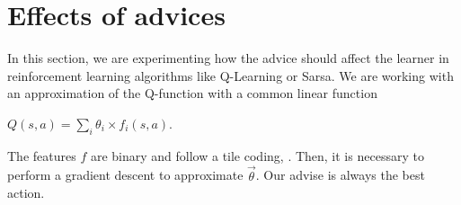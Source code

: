 \documentclass[a4paper,12pt]{article}
\begin{document}
    
% 
%      
% 
%     
%     
%      
%       
%       

      \newpage
      \section{Effects of advices}
      
      In this section, we are experimenting how the advice should affect the learner in reinforcement
      learning algorithms like Q-Learning or Sarsa.
      We are working with an approximation of the Q-function with a common linear function 
      \begin{footnotesize}
       $Q(s,a) = \sum\limits_{i} \theta_{i} \times f_{i}(s,a)$.
      \end{footnotesize}
      The features $f$ are binary and follow a tile coding, \cite{ReinforceLearningIntro}.
      Then, it is necessary to perform a gradient descent to approximate $\vec\theta$.
      Our advise is always the best action.
      
\end{document}
